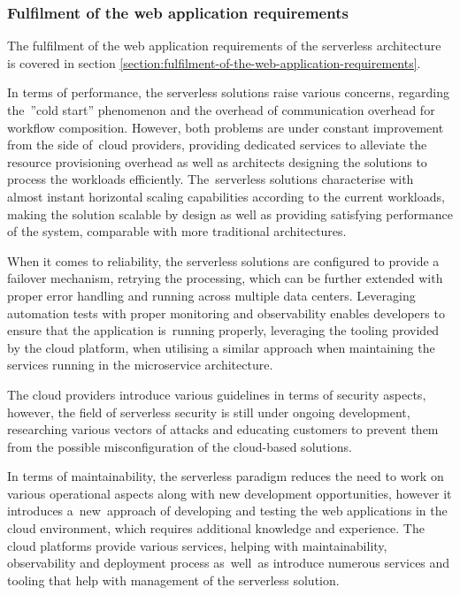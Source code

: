 \subsubsection{Fulfilment of the web application requirements}

The fulfilment of the web application requirements of the serverless architecture is covered in section \ref{section:fulfilment-of-the-web-application-requirements}.

In terms of performance, the serverless solutions raise various concerns, regarding the~''cold start'' phenomenon and the overhead of communication overhead for workflow composition. However, both problems are under constant improvement from the side of~cloud providers, providing dedicated services to alleviate the resource provisioning overhead as well as architects designing the solutions to process the workloads efficiently.
The~serverless solutions characterise with almost instant horizontal scaling capabilities according to the current workloads, making the solution scalable by design as well as providing satisfying performance of the system, comparable with more traditional architectures.

When it comes to reliability, the serverless solutions are configured to provide a failover mechanism, retrying the processing, which can be further extended with proper error handling and running across multiple data centers.
Leveraging automation tests with proper monitoring and observability enables developers to ensure that the application is~running properly, leveraging the tooling provided by the cloud platform, when utilising a similar approach when maintaining the services running in the microservice architecture.

The cloud providers introduce various guidelines in terms of security aspects, however, the field of serverless security is still under ongoing development, researching various vectors of attacks and educating customers to prevent them from the possible misconfiguration of the cloud-based solutions.

In terms of maintainability, the serverless paradigm reduces the need to work on various operational aspects along with new development opportunities, however it introduces a~new~approach of developing and testing the web applications in the cloud environment, which requires additional knowledge and experience.
The cloud platforms provide various services, helping with maintainability, observability and deployment process as~well~as introduce numerous services and tooling that help with management of the serverless solution.


